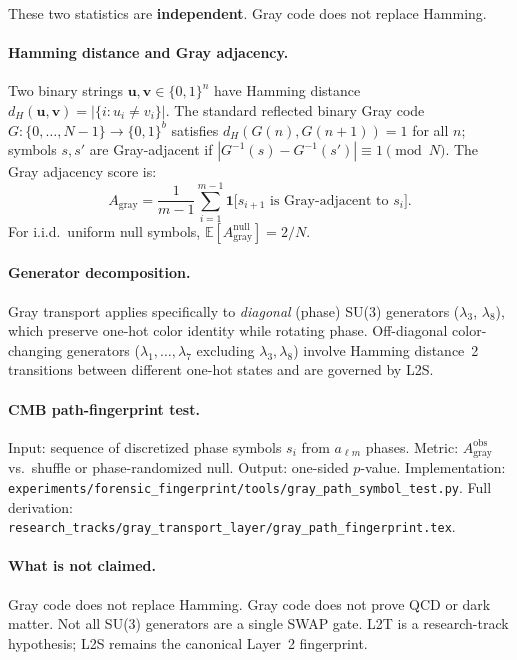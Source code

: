 \documentclass[11pt]{article}
\begin{document}
These two statistics are \textbf{independent}. Gray code does not replace Hamming.

\paragraph{Hamming distance and Gray adjacency.}
Two binary strings $\mathbf{u}, \mathbf{v} \in \{0,1\}^n$ have Hamming distance
$d_H(\mathbf{u},\mathbf{v}) = |\{i : u_i \neq v_i\}|$. The standard reflected
binary Gray code $G : \{0,\dots,N{-}1\} \to \{0,1\}^b$ satisfies $d_H(G(n),G(n{+}1)) = 1$
for all $n$; symbols $s, s'$ are Gray-adjacent if $|G^{-1}(s)-G^{-1}(s')|\equiv 1 \pmod{N}$.
The Gray adjacency score is:
\begin{equation}
A_{\mathrm{gray}} = \frac{1}{m-1}\sum_{i=1}^{m-1}
  \mathbf{1}\bigl[s_{i+1} \text{ is Gray-adjacent to } s_i\bigr].
\end{equation}
For i.i.d.\ uniform null symbols, $\mathbb{E}[A_{\mathrm{gray}}^{\mathrm{null}}] = 2/N$.

\paragraph{Generator decomposition.}
Gray transport applies specifically to \emph{diagonal} (phase) SU(3) generators
($\lambda_3$, $\lambda_8$), which preserve one-hot color identity while rotating
phase. Off-diagonal color-changing generators ($\lambda_1,\dots,\lambda_7$ excluding
$\lambda_3,\lambda_8$) involve Hamming distance~2 transitions between different
one-hot states and are governed by L2S.

\paragraph{CMB path-fingerprint test.}
Input: sequence of discretized phase symbols $s_i$ from $a_{\ell m}$ phases.
Metric: $A_{\mathrm{gray}}^{\mathrm{obs}}$ vs.\ shuffle or phase-randomized null.
Output: one-sided $p$-value. Implementation:
\texttt{experiments/forensic\_fingerprint/tools/gray\_path\_symbol\_test.py}.
Full derivation: \texttt{research\_tracks/gray\_transport\_layer/gray\_path\_fingerprint.tex}.

\paragraph{What is not claimed.}
Gray code does not replace Hamming.
Gray code does not prove QCD or dark matter.
Not all SU(3) generators are a single SWAP gate.
L2T is a research-track hypothesis; L2S remains the canonical Layer~2 fingerprint.
\end{document}
